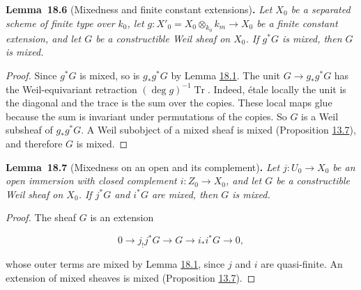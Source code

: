 \documentclass[11pt]{article}
\newenvironment{bpstatement}[2]{\par\addvspace{0.6\baselineskip}\noindent\textbf{#1}#2\textbf{.}\enspace\ignorespaces}
  {\par\addvspace{0.4\baselineskip}}
\newenvironment{bpstatementit}[2]{\begin{bpstatement}{#1}{#2}\itshape\ignorespaces}{\end{bpstatement}}
\begin{document}
\label{bp291}%
\begin{bpstatementit}{Lemma~18.6}{ (Mixedness and finite constant extensions)}
Let \(X_0\) be a separated scheme of finite type over \(k_0\), let \(g:X'_0=X_0\otimes_{k_0}k_m\to X_0\) be a finite constant extension, and let \(G\) be a constructible Weil sheaf on \(X_0\). If \(g^*G\) is mixed, then \(G\) is mixed.
\end{bpstatementit}

\begin{proof}[{Proof}]\label{bp292}%
Since \(g^*G\) is mixed, so is \(g_*g^*G\) by Lemma \hyperref[bp275]{18.1}. The unit \(G\to g_*g^*G\) has the Weil-equivariant retraction \((\deg g)^{-1}\operatorname{Tr}\). Indeed, étale locally the unit is the diagonal and the trace is the sum over the copies. These local maps glue because the sum is invariant under permutations of the copies. So \(G\) is a Weil subsheaf of \(g_*g^*G\). A Weil subobject of a mixed sheaf is mixed (Proposition \hyperref[bp24]{13.7}), and therefore \(G\) is mixed.
\end{proof}

\label{bp293}%
\begin{bpstatementit}{Lemma~18.7}{ (Mixedness on an open and its complement)}
Let \(j:U_0\to X_0\) be an open immersion with closed complement \(i:Z_0\to X_0\), and let \(G\) be a constructible Weil sheaf on \(X_0\). If \(j^*G\) and \(i^*G\) are mixed, then \(G\) is mixed.
\end{bpstatementit}

\begin{proof}[{Proof}]\label{bp294}%
The sheaf \(G\) is an extension

\[
0\longrightarrow j_!j^*G\longrightarrow G
\longrightarrow i_*i^*G\longrightarrow0,
\]

whose outer terms are mixed by Lemma \hyperref[bp275]{18.1}, since \(j\) and \(i\) are quasi-finite. An extension of mixed sheaves is mixed (Proposition \hyperref[bp24]{13.7}).
\end{proof}
\end{document}
